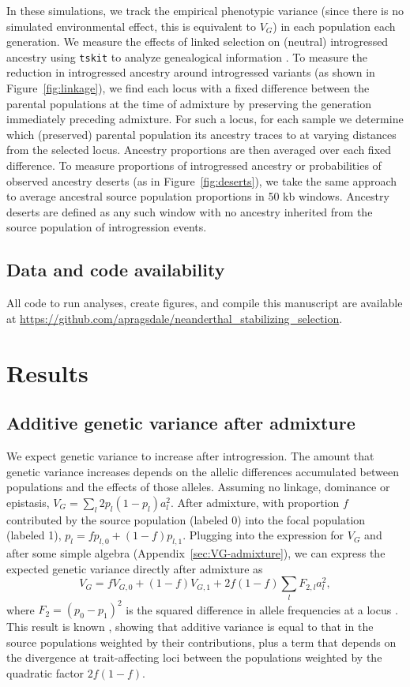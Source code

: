 \documentclass{article}
\newcommand{\tskit}{\texttt{tskit}\xspace}
\begin{document}
In these simulations, we track the empirical phenotypic variance (since there
is no simulated environmental effect, this is equivalent to $V_G$) in each
population each generation. We measure the effects of linked selection on
(neutral) introgressed ancestry using \tskit to analyze genealogical
information \citep{ralph2020efficiently}. To measure the reduction in
introgressed ancestry around introgressed variants (as shown in
Figure~\ref{fig:linkage}), we find each locus with a fixed difference between
the parental populations at the time of admixture by preserving the generation
immediately preceding admixture. For such a locus, for each sample we determine
which (preserved) parental population its ancestry traces to at varying
distances from the selected locus. Ancestry proportions are then averaged over
each fixed difference. To measure proportions of introgressed ancestry or
probabilities of observed ancestry deserts (as in Figure~\ref{fig:deserts}), we
take the same approach to average ancestral source population proportions in 50
kb windows. Ancestry deserts are defined as any such window with no ancestry
inherited from the source population of introgression events.

\subsection*{Data and code availability}

All code to run analyses, create figures, and compile this manuscript are available
at \url{https://github.com/apragsdale/neanderthal_stabilizing_selection}.

\section*{Results}

\subsection*{Additive genetic variance after admixture}

We expect genetic variance to increase after introgression. The amount that
genetic variance increases depends on the allelic differences accumulated
between populations and the effects of those alleles. Assuming no linkage,
dominance or epistasis, \(V_G=\sum_l 2p_l(1-p_l)a_l^2\). After admixture, with
proportion $f$ contributed by the source population (labeled 0) into the focal
population (labeled 1), \(p_l = fp_{l,0} + (1-f)p_{l,1}\). Plugging into the
expression for $V_G$ and after some simple algebra
(Appendix~\ref{sec:VG-admixture}), we can express the expected genetic variance
directly after admixture as \[V_G = fV_{G,0} + (1-f) V_{G,1} + 2f(1-f)\sum_l
F_{2,l} a_l^2,\] where $F_2 = (p_0 - p_1)^2$ is the squared difference in
allele frequencies at a locus \citep{peter2016admixture}. This result is known
\citep[e.g.,][]{tufto2000quantitative}, showing that additive variance is equal
to that in the source populations weighted by their contributions, plus a term
that depends on the divergence at trait-affecting loci between the populations
weighted by the quadratic factor $2f(1-f)$.
\end{document}
